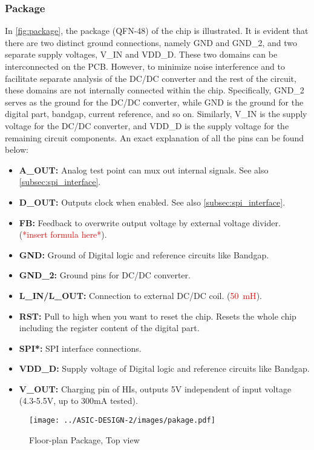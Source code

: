 \subsubsection{Package}
In \autoref{fig:package}, the package (QFN-48) of the chip is illustrated. It is evident that there are two distinct ground connections, namely GND and GND\_2, and two separate supply voltages, V\_IN and VDD\_D. These two domains can be interconnected on the \ac{PCB}. However, to minimize noise interference and to facilitate separate analysis of the DC/DC converter and the rest of the circuit, these domains are not internally connected within the chip. Specifically, GND\_2 serves as the ground for the DC/DC converter, while GND is the ground for the digital part, bandgap, current reference, and so on. Similarly, V\_IN is the supply voltage for the DC/DC converter, and VDD\_D is the supply voltage for the remaining circuit components. An exact explanation of all the pins can be found below:
\begin{itemize}
	\item \textbf{A\_OUT:} Analog test point can mux out internal signals. See also \autoref{subsec:spi_interface}.
	\item \textbf{D\_OUT:} Outputs clock when enabled. See also \autoref{subsec:spi_interface}.
	\item \textbf{FB:} Feedback to overwrite output voltage by external voltage divider. (\textcolor{red}{*insert formula here*}).
	\item \textbf{GND:} Ground of Digital logic and reference circuits like Bandgap.
	\item \textbf{GND\_2:} Ground pins for DC/DC converter.
	\item \textbf{L\_IN/L\_OUT:} Connection to external DC/DC coil. (\textcolor{red}{\qty{50}{\milli\henry}}).
	\item \textbf{RST:} Pull to high when you want to reset the chip. Resets the whole chip including the register content of the digital part.
	\item \textbf{SPI*:} SPI interface connections.
	\item \textbf{VDD\_D:} Supply voltage of Digital logic and reference circuits like Bandgap.
	\item \textbf{V\_OUT:} Charging pin of HIs, outputs 5V independent of input voltage (4.3-5.5V, up to 300mA tested).
\end{itemize}
\begin{figure}[h]
	\centering
	\texttt{[image: ../ASIC-DESIGN-2/images/pakage.pdf]}
	\caption{Floor-plan Package, Top view}
	\label{fig:package}
\end{figure}
